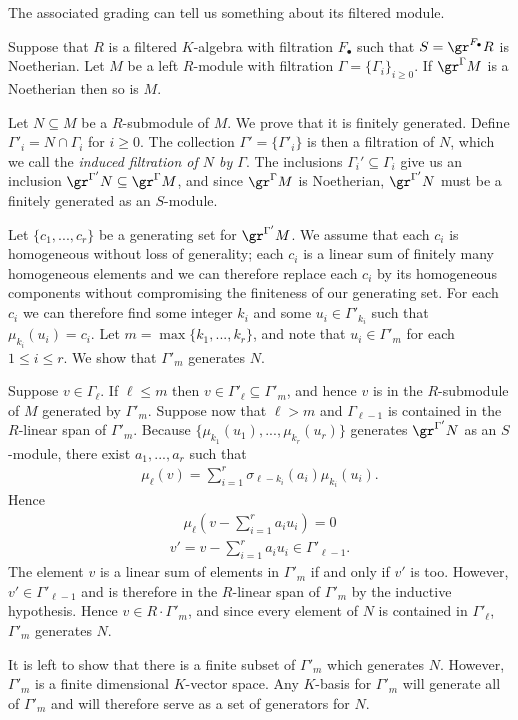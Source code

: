 The associated grading can tell us something about its filtered module.
\begin{thm}\label{thm:noeth-assoc-graded-module}
	Suppose that $R$ is a filtered $K$-algebra with filtration $F_\bullet$ such that $S = \gr^{F_\bullet} R$ is Noetherian. Let $M$ be a left $R$-module with filtration $\Gamma = \{\Gamma_i\}_{i\geq 0}$. If $\gr^\Gamma M$ is a Noetherian then so is $M$.
\end{thm}
\begin{prf}
	Let $N \subseteq M$ be a $R$-submodule of $M$. We prove that it is finitely generated. Define $\Gamma'_i = N \cap \Gamma_i$ for $i \geq 0$. The collection $\Gamma' = \{\Gamma'_i\}$ is then a filtration of $N$, which we call the \emph{induced filtration of $N$ by $\Gamma$}. The inclusions $\Gamma_i' \subseteq \Gamma_i$ give us an inclusion $\gr^{\Gamma'} N \subseteq \gr^\Gamma M$, and since $\gr^\Gamma M$ is Noetherian, $\gr^{\Gamma'}N$ must be a finitely generated as an $S$-module.

	Let $\{c_1,...,c_r\}$ be a generating set for $\gr^{\Gamma'}M$. We assume that each $c_i$ is homogeneous without loss of generality; each $c_i$ is a linear sum of finitely many homogeneous elements and we can therefore replace each $c_i$ by its homogeneous components without compromising the finiteness of our generating set. For each $c_i$ we can therefore find some integer $k_i$ and some $u_i \in \Gamma'_{k_i}$ such that $\mu_{k_i}(u_i) = c_i$. Let $m = \max\{k_1,...,k_r\}$, and note that $u_i \in \Gamma'_m$ for each $1\leq i\leq r$. We show that $\Gamma'_m$ generates $N$.

    Suppose $v \in \Gamma_\ell$. If $\ell \leq m$ then $v \in \Gamma'_\ell \subseteq \Gamma'_m$, and hence $v$ is in the $R$-submodule of $M$ generated by $\Gamma'_m$. Suppose now that $\ell > m$ and $\Gamma_{\ell - 1}$ is contained in the $R$-linear span of $\Gamma'_m$. Because $\{\mu_{k_1}(u_1),...,\mu_{k_r}(u_r)\}$ generates $\gr^{\Gamma'}N$ as an $S$-module, there exist $a_1,...,a_r$ such that
	\begin{align*}
		\mu_\ell(v) = \sum_{i=1}^r \sigma_{\ell-k_i}(a_i)\mu_{k_i}(u_i).
	\end{align*}
	Hence
	\begin{align*}
		\mu_\ell \left(v - \sum_{i=1}^r a_i u_i\right) = 0
	\end{align*}
	\begin{align*}
		v' = v - \sum_{i=1}^r a_i u_i \in \Gamma'_{\ell - 1}.
	\end{align*}
	The element $v$ is a linear sum of elements in $\Gamma'_m$ if and only if $v'$ is too. However, $v' \in \Gamma'_{\ell - 1}$ and is therefore in the $R$-linear span of $\Gamma'_{m}$ by the inductive hypothesis. Hence $v \in R\cdot \Gamma'_m$, and since every element of $N$ is contained in $\Gamma'_\ell$, $\Gamma'_m$ generates $N$.

	It is left to show that there is a finite subset of $\Gamma'_m$ which generates $N$. However, $\Gamma'_m$ is a finite dimensional $K$-vector space. Any $K$-basis for $\Gamma'_m$ will generate all of $\Gamma'_m$ and will therefore serve as a set of generators for $N$.
\end{prf}
